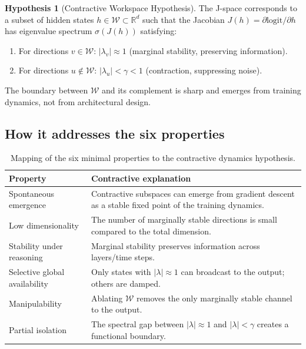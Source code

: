 \documentclass[11pt,a4paper]{article}
\theoremstyle{definition}
\newtheorem{hypothesis}{Hypothesis}
\begin{document}
\begin{hypothesis}[Contractive Workspace Hypothesis]
The J-space corresponds to a subset of hidden states $h \in \mathcal{W} \subset
\mathbb{R}^d$ such that the Jacobian $J(h) = \partial \text{logit} / \partial h$
has eigenvalue spectrum $\sigma(J(h))$ satisfying:
\begin{enumerate}
    \item For directions $v \in \mathcal{W}$: $|\lambda_v| \approx 1$ (marginal
    stability, preserving information).
    \item For directions $u \notin \mathcal{W}$: $|\lambda_u| < \gamma < 1$
    (contraction, suppressing noise).
\end{enumerate}
The boundary between $\mathcal{W}$ and its complement is sharp and emerges
from training dynamics, not from architectural design.
\end{hypothesis}

\subsection{How it addresses the six properties}

\begin{table}[htbp]
\centering
\begin{tabular}{@{}lp{8cm}@{}}
\toprule
\textbf{Property} & \textbf{Contractive explanation} \\
\midrule
Spontaneous emergence & Contractive subspaces can emerge from gradient descent
as a stable fixed point of the training dynamics. & \\
Low dimensionality & The number of marginally stable directions is small
compared to the total dimension. & \\
Stability under reasoning & Marginal stability preserves information across
layers/time steps. & \\
Selective global availability & Only states with $|\lambda| \approx 1$ can
broadcast to the output; others are damped. & \\
Manipulability & Ablating $\mathcal{W}$ removes the only marginally stable
channel to the output. & \\
Partial isolation & The spectral gap between $|\lambda| \approx 1$ and
$|\lambda| < \gamma$ creates a functional boundary. & \\
\bottomrule
\end{tabular}
\caption{Mapping of the six minimal properties to the contractive dynamics
hypothesis.}
\label{tab:contractive}
\end{table}
\end{document}
